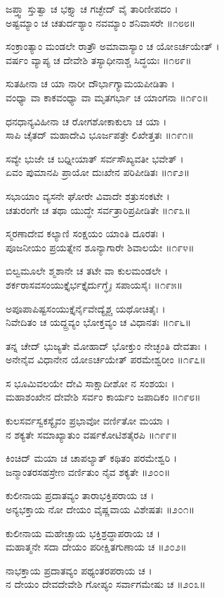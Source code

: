 ಜಪ್ತ್ವಾ ಸ್ತುತ್ವಾ ಚ ಭಕ್ತ್ಯಾ ಚ ಗಚ್ಛೇದ್ ವೈ ತಾರಿಣೀಪದಂ ।\\
ಅಷ್ಟಮ್ಯಾಂ ಚ ಚತುರ್ದಶ್ಯಾಂ ನವಮ್ಯಾಂ ಶನಿವಾಸರೇ ॥೧೮೮॥

ಸಂಕ್ರಾಂತ್ಯಾಂ ಮಂಡಲೇ ರಾತ್ರೌ ಅಮಾವಾಸ್ಯಾಂ ಚ ಯೋಽರ್ಚಯೇತ್ ।\\
ವರ್ಷಂ ವ್ಯಾಪ್ಯ ಚ ದೇವೇಶಿ ತಸ್ಯಾಧೀನಾಶ್ಚ ಸಿದ್ಧಯಃ ॥೧೮೯॥

ಸುತಹೀನಾ ಚ ಯಾ ನಾರೀ ದೌರ್ಭಾಗ್ಯಾಮಯಪೀಡಿತಾ ।\\
ವಂಧ್ಯಾ ವಾ ಕಾಕವಂಧ್ಯಾ ವಾ ಮೃತಗರ್ಭಾ ಚ ಯಾಂಗನಾ ॥೧೯೦॥

ಧನಧಾನ್ಯವಿಹೀನಾ ಚ ರೋಗಶೋಕಾಕುಲಾ ಚ ಯಾ ।\\
ಸಾಪಿ ಚೈತದ್ ಮಹಾದೇವಿ ಭೂರ್ಜಪತ್ರೇ ಲಿಖೇತ್ತತಃ ॥೧೯೧॥

ಸವ್ಯೇ ಭುಜೇ ಚ ಬಧ್ನೀಯಾತ್ ಸರ್ವಸೌಖ್ಯವತೀ ಭವೇತ್ ।\\
ಏವಂ ಪುಮಾನಪಿ ಪ್ರಾಯೋ ದುಃಖೇನ ಪರಿಪೀಡಿತಃ ॥೧೯೨॥

ಸಭಾಯಾಂ ವ್ಯಸನೇ ಘೋರೇ ವಿವಾದೇ ಶತ್ರುಸಂಕಟೇ ।\\
ಚತುರಂಗೇ ಚ ತಥಾ ಯುದ್ಧೇ ಸರ್ವತ್ರಾರಿಪ್ರಪೀಡಿತೇ ॥೧೯೩॥

ಸ್ಮರಣಾದೇವ ಕಲ್ಯಾಣಿ ಸಂಕ್ಷಯಂ ಯಾಂತಿ ದೂರತಃ ।\\
ಪೂಜನೀಯಂ ಪ್ರಯತ್ನೇನ ಶೂನ್ಯಾಗಾರೇ ಶಿವಾಲಯೇ ॥೧೯೪॥

ಬಿಲ್ವಮೂಲೇ ಶ್ಮಶಾನೇ ಚ ತಟೇ ವಾ ಕುಲಮಂಡಲೇ ।\\
ಶರ್ಕರಾಸವಸಂಯುಕ್ತೈರ್ಭಕ್ತೈರ್ದುಗ್ಧೈಃ ಸಪಾಯಸೈಃ ॥೧೯೫॥

ಅಪೂಪಾಪಿಷ್ಟಸಂಯುಕ್ತೈರ್ನೈವೇದ್ಯೈಶ್ಚ ಯಥೋಚಿತೈಃ ।\\
ನಿವೇದಿತಂ ಚ ಯದ್ದ್ರವ್ಯಂ ಭೋಕ್ತವ್ಯಂ ಚ ವಿಧಾನತಃ ॥೧೯೬॥

ತನ್ನ ಚೇದ್ ಭುಜ್ಯತೇ ಮೋಹಾದ್ ಭೋಕ್ತುಂ ನೇಚ್ಛಂತಿ ದೇವತಾಃ ।\\
ಅನೇನೈವ ವಿಧಾನೇನ ಯೋಽರ್ಚಯೇತ್ ಪರಮೇಶ್ವರೀಂ ॥೧೯೭॥

ಸ ಭೂಮಿವಲಯೇ ದೇವಿ ಸಾಕ್ಷಾದೀಶೋ ನ ಸಂಶಯಃ ।\\
ಮಹಾಶಂಖೇನ ದೇವೇಶಿ ಸರ್ವಂ ಕಾರ್ಯಂ ಜಪಾದಿಕಂ ॥೧೯೮॥

ಕುಲಸರ್ವಸ್ವಕಸ್ಯೈವಂ ಪ್ರಭಾವೋ ವರ್ಣಿತೋ ಮಯಾ ।\\
ನ ಶಕ್ಯತೇ ಸಮಾಖ್ಯಾತುಂ ವರ್ಷಕೋಟಿಶತೈರಪಿ ॥೧೯೯॥

ಕಿಂಚಿದ್ ಮಯಾ ಚ ಚಾಪಲ್ಯಾತ್ ಕಥಿತಂ ಪರಮೇಶ್ವರಿ ।\\
ಜನ್ಮಾಂತರಸಹಸ್ರೇಣ ವರ್ಣಿತುಂ ನೈವ ಶಕ್ಯತೇ ॥೨೦೦॥

ಕುಲೀನಾಯ ಪ್ರದಾತವ್ಯಂ ತಾರಾಭಕ್ತಿಪರಾಯ ಚ ।\\
ಅನ್ಯಭಕ್ತಾಯ ನೋ ದೇಯಂ ವೈಷ್ಣವಾಯ ವಿಶೇಷತಃ ॥೨೦೧॥

ಕುಲೀನಾಯ ಮಹೇಚ್ಛಾಯ ಭಕ್ತಿಶ್ರದ್ಧಾಪರಾಯ ಚ ।\\
ಮಹಾತ್ಮನೇ ಸದಾ ದೇಯಂ ಪರೀಕ್ಷಿತಗುಣಾಯ ಚ ॥೨೦೨॥

ನಾಭಕ್ತಾಯ ಪ್ರದಾತವ್ಯಂ ಪಥ್ಯಂತರಪರಾಯ ಚ ।\\
ನ ದೇಯಂ ದೇವದೇವೇಶಿ ಗೋಪ್ಯಂ ಸರ್ವಾಗಮೇಷು ಚ ॥೨೦೩॥

